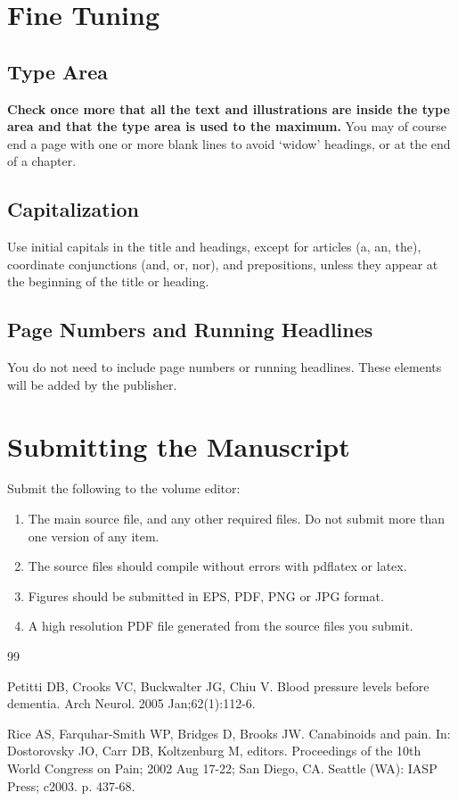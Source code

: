 \documentclass{IOS-Book-Article}
\begin{document}
\section{Fine Tuning}

\subsection{Type Area}
\textbf{Check once more that all the text and illustrations are inside the type area and
that the type area is used to the maximum.} You may of course end a page with one
or more blank lines to avoid `widow' headings, or at the end of a chapter.

\subsection{Capitalization}
Use initial capitals in the title and headings, except for articles (a, an, the), coordinate
conjunctions (and, or, nor), and prepositions, unless they appear at the beginning of the
title or heading.

\subsection{Page Numbers and Running Headlines}
You do not need to include page numbers or running headlines. These elements will be
added by the publisher.

\section{Submitting the Manuscript}
Submit the following to the volume editor:

\begin{enumerate}
\item The main source file, and any other required files. Do not submit more than
one version of any item.

\item The source files should compile without errors with pdflatex or latex.

\item Figures should be submitted in EPS, PDF, PNG or JPG format.

\item A high resolution PDF file generated from the source files you submit.
\end{enumerate}

\begin{thebibliography}{99}


Petitti DB, Crooks VC, Buckwalter JG, Chiu V. Blood pressure levels before dementia.
Arch Neurol. 2005 Jan;62(1):112-6.

Rice AS, Farquhar-Smith WP, Bridges D, Brooks JW. Canabinoids and pain. In: Dostorovsky JO,
Carr DB, Koltzenburg M, editors. Proceedings of the 10th World Congress on Pain;  2002 Aug
17-22; San Diego, CA. Seattle (WA): IASP Press; c2003. p. 437-68.

\end{thebibliography}
\fi
\end{document}
